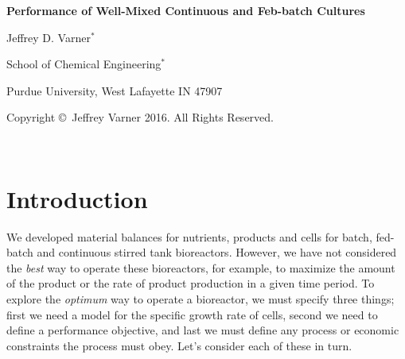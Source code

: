 \documentclass[11pt]{article}
\theoremstyle{definition}
\begin{document}
{\par\centering\textbf{\Large Performance of Well-Mixed Continuous and Feb-batch Cultures}}
\vspace{0.2in}
{\par \centering \large{Jeffrey D. Varner$^{*}$}}
\vspace{0.05in}
{\par \centering \large{School of Chemical Engineering$^{*}$}}
{\par \centering \large{Purdue University, West Lafayette IN 47907}}
\vspace{0.1in}
{\par \centering \small{Copyright \copyright\ Jeffrey Varner 2016. All Rights Reserved.}}\\

\date{}
\thispagestyle{empty}

\setcounter{page}{1}

\section*{Introduction}
We developed material balances for nutrients, products and cells for batch, fed-batch and continuous stirred tank bioreactors.
However, we have not considered the \textit{best} way to operate these bioreactors, for example, to maximize the amount of the product or
the rate of product production in a given time period. To explore the \textit{optimum} way to operate a bioreactor, we must specify three things;
first we need a model for the specific growth rate of cells, second we need to define a performance objective,
and last we must define any process or economic constraints the process must obey.
Let's consider each of these in turn.
\end{document}
